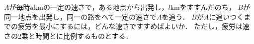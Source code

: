 \documentclass[../../main.tex]{subfiles}
\begin{document}
$A$が毎時$a$kmの一定の速さで，ある地点から出発し，$l$kmをすすんだのち，
$B$が同一地点を出発し，同一の路をへて一定の速さで$A$を追う．
$B$が$A$に追いつくまでの疲労を最小にするには，どんな速さですすめばよいか．
ただし，疲労は速さの2乗と時間とに比例するものとする．
\end{document}
